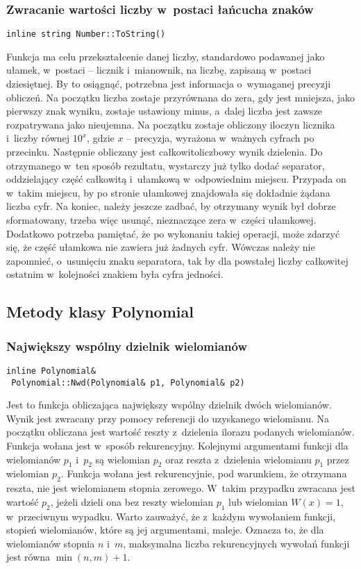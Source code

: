 \subsubsection{Zwracanie wartości liczby w~postaci łańcucha znaków}
\begin{lstlisting}
inline string Number::ToString()
\end{lstlisting}

Funkcja ma celu przekształcenie danej liczby, standardowo podawanej jako ułamek, w~postaci -- licznik i~mianownik, na liczbę, zapisaną w~postaci dziesiętnej. By to osiągnąć, potrzebna jest informacja o~wymaganej precyzji obliczeń. Na początku liczba zostaje przyrównana do zera, gdy jest mniejsza, jako pierwszy znak wyniku, zostaje ustawiony minus, a~dalej liczba jest zawsze rozpatrywana jako nieujemna. Na początku zostaje obliczony iloczyn licznika i~liczby równej $10^x$, gdzie $x$ -- precyzja, wyrażona w~ważnych cyfrach po przecinku. Następnie obliczany jest całkowitoliczbowy wynik dzielenia. Do otrzymanego w~ten sposób rezultatu, wystarczy już tylko dodać separator, oddzielający część całkowitą i~ułamkową w~odpowiednim miejscu. Przypada on w~takim miejscu, by po stronie ułamkowej znajdowała się dokładnie żądana liczba cyfr. Na koniec, należy jeszcze zadbać, by otrzymany wynik był dobrze sformatowany, trzeba więc usunąć, nieznaczące zera w~części ułamkowej. Dodatkowo potrzeba pamiętać, że po wykonaniu takiej operacji, może zdarzyć się, że część ułamkowa nie zawiera już żadnych cyfr. Wówczas należy nie zapomnieć, o~usunięciu znaku separatora, tak by dla powstałej liczby całkowitej ostatnim w~kolejności znakiem była cyfra jedności.

\subsection{Metody klasy Polynomial}

\subsubsection{Największy wspólny dzielnik wielomianów}
\begin{lstlisting}
inline Polynomial&
 Polynomial::Nwd(Polynomial& p1, Polynomial& p2)
\end{lstlisting}

Jest to funkcja obliczająca największy wspólny dzielnik dwóch wielomianów. Wynik jest zwracany przy pomocy referencji do uzyskanego wielomianu. Na początku obliczana jest wartość reszty z~dzielenia ilorazu podanych wielomianów. Funkcja wołana jest w~sposób rekurencyjny. Kolejnymi argumentami funkcji dla wielomianów $p_1$ i~$p_2$ są wielomian $p_2$ oraz reszta z~dzielenia wielomianu $p_1$ przez wielomian $p_2$. Funkcja wołana jest rekurencyjnie, pod warunkiem, że otrzymana reszta, nie jest wielomianem stopnia zerowego. W~takim przypadku zwracana jest wartość $p_2$, jeżeli dzieli ona bez reszty wielomian $p_1$ lub wielomian $W(x)=1$, w~przeciwnym wypadku. Warto zauważyć, że z~każdym wywołaniem funkcji, stopień wielomianów, które są jej argumentami, maleje. Oznacza to, że dla wielomianów stopnia $n$ i~$m$, maksymalna liczba rekurencyjnych wywołań funkcji jest równa $\min(n,m)+1$.

